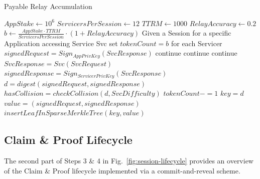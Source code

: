 \documentclass[runningheads]{llncs}
\begin{document}
\begin{algorithm}[h]
    \caption{Payable Relay Accumulation}\label{algo_relay}
    \begin{algorithmic}[1]
        \State $AppStake \gets 10^6$
        \State $ServicersPerSession \gets 12$
        \State $TTRM \gets 1000$
        \State $RelayAccuracy \gets 0.2$
        \State $b \gets \frac{AppStake \cdot TTRM}{ServicersPerSession}\cdot ( 1 + RelayAccuracy) $
        \newline
        \State Given a Session for a specific Application accessing Service Svc
        \newline
        \For{Servicers $[S_1, ..., S_N]$ between Blocks $[B, B+W)$}
            \State set $tokenCount = b$ for each Servicer
                    \State $signedRequest = Sign_{AppPrivKey}(SvcResponse)$
                        \State continue
                    \EndIf
                        \State continue
                    \EndIf
                        \State continue
                    \EndIf
                    \State $SvcResponse = Svc(SvcRequest)$
                    \State $signedResponse = Sign_{ServicerPrivKey}(SvcResponse)$
                    \State $d = digest(signedRequest, signedResponse)$
                    \State $hasCollision = checkCollision(d, SvcDifficulty)$
                        \State $tokenCount -= 1$
                        \State $key = d$
                        \State $value = (signedRequest, signedResponse)$ 
                        \State $insertLeafInSparseMerkleTree(key, value)$
                    \EndIf
                \EndFor
            \EndFor
    \end{algorithmic}
\end{algorithm}

\subsection{Claim \& Proof Lifecycle}
The second part of Steps 3 \& 4 in Fig.~\ref{fig:session-lifecycle} provides an overview of the Claim \& Proof lifecycle implemented via a commit-and-reveal scheme.
\end{document}
